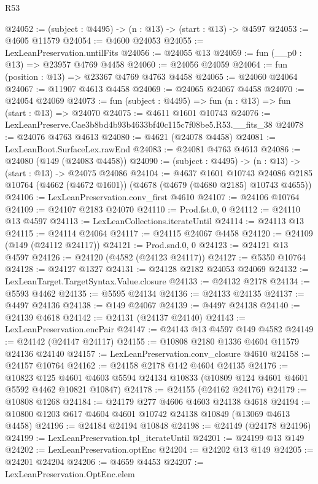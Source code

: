 \begin{lexlean}{R53}
\begin{coremodule}
@24052 := (subject : @4495) -> (n : @13) -> (start : @13) -> @4597
@24053 := @4605 @11579
@24054 := @4600 @24053
@24055 := LexLeanPreservation.untilFits
@24056 := @24055 @13
@24059 := fun (__p0 : @13) => @23957 @4769 @4458
@24060 := @24056 @24059
@24064 := fun (position : @13) => @23367 @4769 @4763 @4458
@24065 := @24060 @24064
@24067 := @11907 @4613 @4458
@24069 := @24065 @24067 @4458
@24070 := @24054 @24069
@24073 := fun (subject : @4495) => fun (n : @13) => fun (start : @13) => @24070
@24075 := @4611 @1601 @10743
@24076 := LexLeanPreserve.Cae3b8bd4b93b4633bf40c115c7f08be5.R53.__fits_38
@24078 := @24076 @4763 @4613
@24080 := @4621 (@24078 @4458)
@24081 := LexLeanBoot.SurfaceLex.rawEnd
@24083 := @24081 @4763 @4613
@24086 := @24080 (@149 (@24083 @4458))
@24090 := (subject : @4495) -> (n : @13) -> (start : @13) -> @24075 @24086
@24104 := @4637
    @1601
    @10743
    @24086
    @2185
    @10764
    (@4662 (@4672 @1601))
    (@4678 (@4679 (@4680 @2185) @10743 @4655))
@24106 := LexLeanPreservation.conv_first @4610
@24107 := @24106 @10764
@24109 := @24107 @2183 @24070
@24110 := Prod.fst.{0, 0}
@24112 := @24110 @13 @4597
@24113 := LexLeanCollections.iterateUntil
@24114 := @24113 @13
@24115 := @24114 @24064
@24117 := @24115 @24067 @4458
@24120 := @24109 (@149 (@24112 @24117))
@24121 := Prod.snd.{0, 0}
@24123 := @24121 @13 @4597
@24126 := @24120 (@4582 (@24123 @24117))
@24127 := @5350 @10764
@24128 := @24127 @1327
@24131 := @24128 @2182 @24053 @24069
@24132 := LexLeanTarget.TargetSyntax.Value.closure
@24133 := @24132 @2178
@24134 := @5593 @4462
@24135 := @5595 @24134
@24136 := @24133 @24135
@24137 := @4497 @24136
@24138 := @149 @24067
@24139 := @4497 @24138
@24140 := @24139 @4618
@24142 := @24131 (@24137 @24140)
@24143 := LexLeanPreservation.encPair
@24147 := @24143 @13 @4597 @149 @4582
@24149 := @24142 (@24147 @24117)
@24155 := @10808 @2180 @1336 @4604 @11579 @24136 @24140
@24157 := LexLeanPreservation.conv_closure @4610
@24158 := @24157 @10764
@24162 := @24158 @2178 @142 @4604 @24135
@24176 := @10823
    @125
    @4601
    @4603
    @5594
    @24134
    @10833
    (@10809 @124 @4601 @4601 @5592 @4462 @10821 @10847)
@24178 := @24155 (@24162 @24176)
@24179 := @10808 @1268
@24184 := @24179 @277 @4606 @4603 @24138 @4618
@24194 := @10800 @1203 @617 @4604 @4601 @10742 @24138 @10849 (@13069 @4613 @4458)
@24196 := @24184 @24194 @10848
@24198 := @24149 (@24178 @24196)
@24199 := LexLeanPreservation.tpl_iterateUntil
@24201 := @24199 @13 @149
@24202 := LexLeanPreservation.optEnc
@24204 := @24202 @13 @149
@24205 := @24201 @24204
@24206 := @4659 @4453
@24207 := LexLeanPreservation.OptEnc.elem

\end{coremodule}
\end{lexlean}
